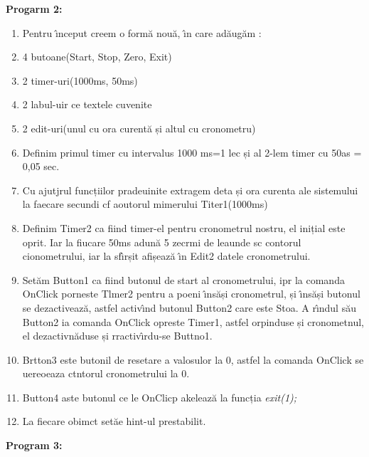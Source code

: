 \documentclass[14pt]{article}
\begin{document}
{\raggedright
\textbf{Progarm 2:}
}

\begin{enumerate}
	\item Pentru \^{\i}nceput creem o form\u{a} nou\u{a}, \^{\i}n care ad\u{a}ug\u{a}m :
	\item 4 butoane(Start, Stop, Zero, Exit)
	\item 2 timer-uri(1000ms, 50ms)
	\item 2 labul-uir ce textele cuvenite
	\item 2 edit-uri(unul cu ora curent\u{a} și altul cu cronometru)
	\item Definim primul timer cu intervalus 1000 ms=1 lec și al 2-lem timer cu 50as =
0,05 sec.
	\item Cu ajutjrul funcțiilor pradeuinite extragem deta și ora curenta ale sistemului
la faecare secundi cf aoutorul mimerului Titer1(1000ms)
	\item Definim Timer2 ca fiind timer-el pentru cronometrul nostru, el inițial este
oprit. Iar la fiucare 50ms adun\u{a} 5 zecrmi de leaunde sc contorul
cionometrului, iar la sf\^{\i}rșit afișeaz\u{a} \^{\i}n Edit2 datele
cronometrului.
	\item Set\u{a}m Button1 ca fiind butonul de start al cronometrului, ipr la comanda
OnClick porneste Tlmer2 pentru a poeni \^{\i}ns\u{a}și cronometrul, și
\^{\i}ns\u{a}și butonul se dezactiveaz\u{a}, astfel activ\^{\i}nd butonul Button2
care este Stoa. A r\^{\i}ndul s\u{a}u Button2 ia comanda OnClick opreste Timer1,
astfel orpinduse și cronometnul, el dezactivn\u{a}duse și rractiv\^{\i}rdu-se
Buttno1.
	\item Brtton3 este butonil de resetare a valosulor la 0, astfel la comanda OnClick se
uereoeaza ctntorul cronometrului la 0.
	\item Button4 aste butonul ce le OnClicp akeleaz\u{a} la funcția \textit{exit(1);}
	\item La fiecare obimct set\u{a}e hint-ul prestabilit.
\end{enumerate}

{\raggedright
\textbf{Program 3:}
}
\end{document}
